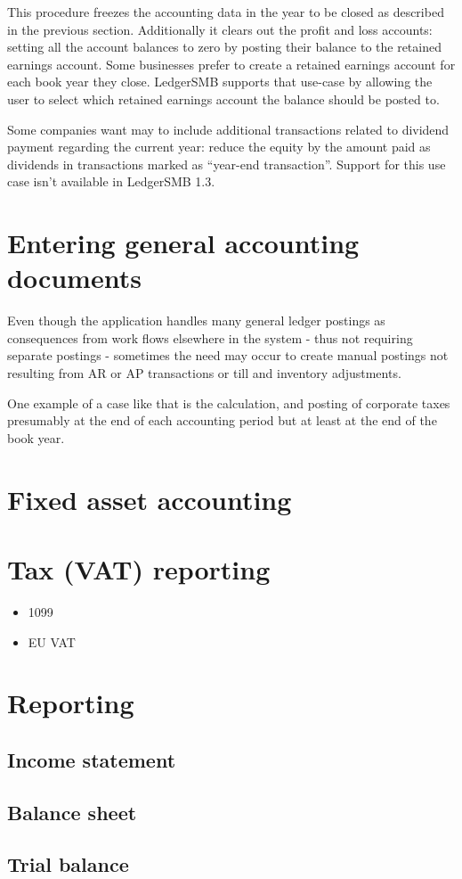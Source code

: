 This procedure freezes the accounting data in the year to be closed as described
in the previous section. Additionally it clears out the profit and loss accounts:
setting all the account
balances to zero by posting their balance to the retained earnings account. Some
businesses prefer to create a retained earnings account for each book year they
close. LedgerSMB supports that use-case by allowing the user to select which
retained earnings account the balance should be posted to.

Some companies want may to include additional transactions related to dividend
payment regarding the current year: reduce the equity by the amount paid as
dividends in transactions marked as ``year-end transaction''. Support
for this use case isn't available in LedgerSMB 1.3.


\section{Entering general accounting documents}

Even though the application handles many general ledger postings as consequences
from work flows elsewhere in the system - thus not requiring separate postings -
sometimes the need may occur to create manual postings not resulting from
AR or AP transactions or till and inventory adjustments.

One example of a case like that is the calculation, and posting of
corporate taxes presumably at the end of each accounting period but at least
at the end of the book year.


\section{Fixed asset accounting}
\label{sec:FixedAssetAccounting}


\section{Tax (VAT) reporting}

\begin{itemize}
\item 1099
\item EU VAT
\end{itemize}


\section{Reporting}
\subsection{Income statement}
\subsection{Balance sheet}
\subsection{Trial balance}


